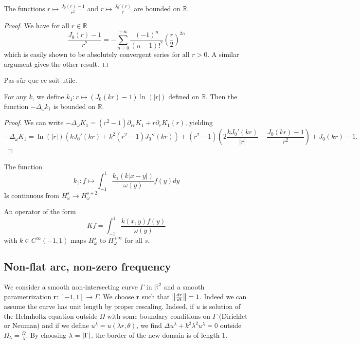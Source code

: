 \documentclass[]{article}
\begin{document}
\begin{Prop}
	The functions $r \mapsto \frac{J_0(r) - 1}{r^2}$ and $r \mapsto \frac{J_0'(r)}{r}$ are bounded on $\mathbb{R}$. 
	\begin{proof}
		We have for all $r \in \mathbb{R}$
		\[\frac{J_0(r)-1}{r^2} = -\sum_{n=0}^{+\infty} \frac{(-1)^n}{(n-1)!^2}\left(\frac{r}{2}\right)^{2n}\]
		which is easily shown to be absolutely convergent series for all $r >0$. 
		A similar argument gives the other result. 
	\end{proof}	
\end{Prop}
Pas sûr que ce soit utile.
\begin{Prop}
	For any $k$, we define $ k_1 : r \mapsto \left(J_0(kr) - 1 \right) \ln(|r|)$ defined on $\mathbb{R}$. Then the function $-\Delta_{\omega} k_1$ is bounded on $\mathbb{R}$. 
	\begin{proof}
		We can write $-\Delta_{\omega}K_1 = (r^2-1) \partial_{rr}K_1 + r \partial_r K_1(r)$, yielding 
		\[-\Delta_{\omega}K_1 = \ln(|r|) \left(kJ_0'(kr) + k^2(r^2 - 1)J_0''(kr)\right) + (r^2-1) \left(2\frac{kJ_0'(kr)}{|r|} - \frac{J_0(kr) - 1}{r^2}\right) + J_0(kr) - 1.\]
	\end{proof}
\end{Prop}
\begin{Cor} The function 
	\[k_1 : f \mapsto \int_{-1}^{1}\frac{k_1(k|x-y|)}{\omega(y)}f(y)dy\]
	Is continuous from $H^s_{\omega} \to H^{s+2}_{\omega}$  
\end{Cor}

\begin{The}
	An operator of the form 
	\begin{equation}
		Kf = \int_{-1}^{1} \frac{k(x,y)f(y)}{\omega(y)}
	\end{equation}
	with $k \in C^{\infty}(-1,1)$ maps $H^s_{\omega}$ to $H^{+\infty}_{\omega}$ for all $s$. 
\end{The}

\subsection{Non-flat arc, non-zero frequency}


We consider a smooth non-intersecting curve $\Gamma$ in $\mathbb{R}^2$ and a smooth parametrization $\textbf{r}: [-1,1] \to \Gamma$. We choose $\textbf{r}$ such that $\left\|\frac{dr}{dt}\right\| = 1$. Indeed we can assume the curve has unit length by proper rescaling. Indeed, if $u$ is solution of the Helmholtz equation outside $\Omega$ with some boundary conditions on $\Gamma$ (Dirichlet or Neuman) and if we define $u^\lambda = u(\lambda r, \theta)$, we find $\Delta u^{\lambda} + k^2 \lambda^2 u^{\lambda} = 0$ outside $\Omega_{\lambda} = \frac{\Omega}{\lambda}$. By choosing $\lambda$ = $\left\lvert \Gamma \right\rvert$, the border of the new domain is of length $1$. 
\end{document}
